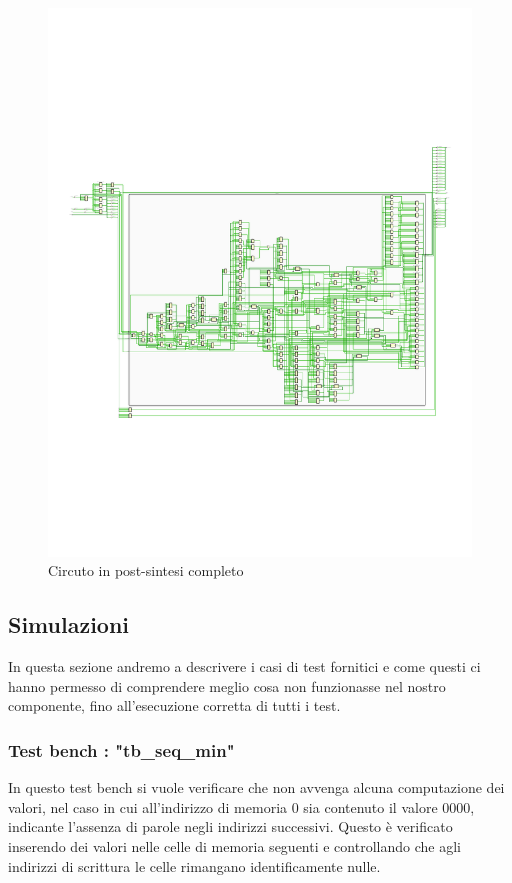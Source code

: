 \documentclass[12pt]{article} %
\begin{document}
			\begin{figure}[H]
				\centering
				\includegraphics[width=1.1\textwidth]{PostSynthesis_Opened_Schematic.pdf}
				\caption{Circuto in post-sintesi completo}
				\label{fig:Schematic_PostSynthesis_Opened}
			\end{figure}
		\subsection{Simulazioni}
			In questa sezione andremo a descrivere i casi di test fornitici e come questi ci 
			hanno permesso di comprendere meglio cosa non funzionasse nel nostro componente, 
			fino all'esecuzione corretta di tutti i test.
			\subsubsection{Test bench : "tb\_seq\_min"}
				In questo test bench si vuole verificare che non avvenga alcuna computazione dei 
				valori, nel caso in cui all'indirizzo di memoria 0 sia contenuto il valore 0000, 
				indicante l'assenza di parole negli indirizzi successivi. 
				Questo è verificato inserendo dei valori nelle celle di memoria seguenti
				e controllando che agli indirizzi di scrittura le celle rimangano identificamente nulle.
				
\end{document}
